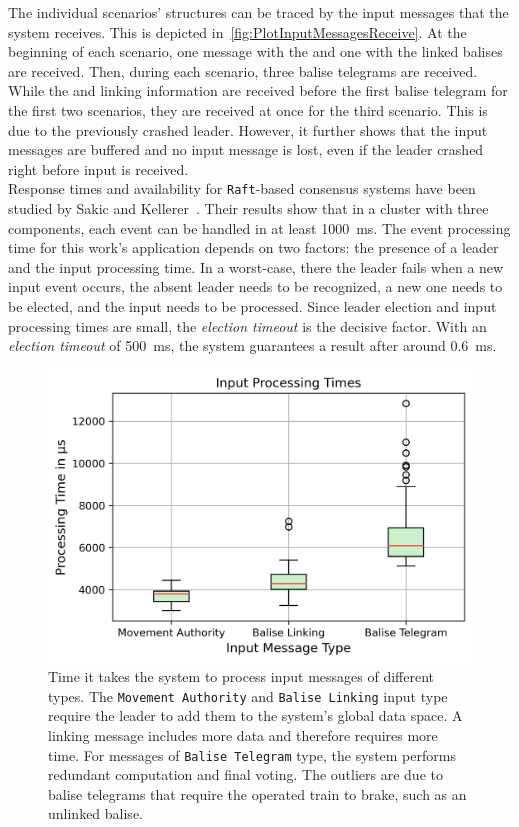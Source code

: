 The individual scenarios' structures can be traced by the input messages that the system receives.
This is depicted in~\autoref{fig:PlotInputMessagesReceive}.
At the beginning of each scenario, one message with the  and one with the linked balises are received.
Then, during each scenario, three balise telegrams are received.
While the  and linking information are received before the first balise telegram for the first two scenarios, they are received at once for the third scenario.
This is due to the previously crashed leader.
However, it further shows that the input messages are buffered and no input message is lost, even if the leader crashed right before input is received.
\\

Response times and availability for \texttt{Raft}-based consensus systems have been studied by Sakic and Kellerer~\cite{SakicTimeInConsensus}.
Their results show that in a cluster with three components, each event can be handled in at least 1000~ms.
The event processing time for this work's application depends on two factors: the presence of a leader and the input processing time.
In a worst-case, there the leader fails when a new input event occurs, the absent leader needs to be recognized, a new one needs to be elected, and the input needs to be processed.
Since leader election and input processing times are small, the \textit{election timeout} is the decisive factor.
With an \textit{election timeout} of 500~ms, the system guarantees a result after around 0.6~ms.


\begin{figure}[!hb]
	\centering
	\includegraphics[width=0.8\linewidth]{images/plots/inputProcessingTimes}
	\caption{Time it takes the system to process input messages of different types. The \texttt{Movement Authority} and \texttt{Balise Linking} input type require the leader to add them to the system's global data space. A linking message includes more data and therefore requires more time. For messages of \texttt{Balise Telegram} type, the system performs redundant computation and final voting. The outliers are due to balise telegrams that require the operated train to brake, such as an unlinked balise.}
	\label{fig:PlotInputProcessingTimes}
\end{figure}

